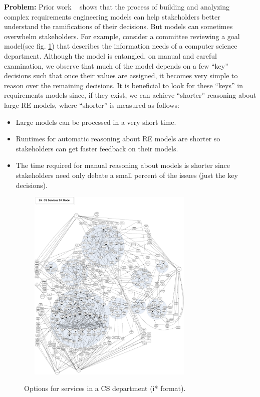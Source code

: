 \documentclass[table, xcdraw, sigconf,review, anonymous]{acmart}
\begin{document}
    \noindent\textbf{Problem:} Prior work ~\cite{Lamsweerde2001,amyot10} shows that the process of building and analyzing complex requirements engineering models can help stakeholders better understand the ramifications of their decisions. But models can sometimes overwhelm stakeholders. For example, consider a committee reviewing a goal model(see fig. \ref{fig:csServices}) that describes the information needs of a computer science department. Although the model is entangled, on manual and careful examination, we observe that much of the model depends on a few ``key'' decisions such that once their values are assigned, it becomes very simple to reason over the remaining decisions. It is beneficial to look for these ``keys'' in requirements models since, if they exist, we can achieve ``shorter'' reasoning about large RE models, where ``shorter'' is measured as follows:
    \begin{itemize}
     \item{Large models can be processed in a very short time.}
     \item{Runtimes for automatic reasoning about RE models are shorter so stakeholders can get faster feedback on their models.}
     \item{The time required for manual reasoning about models is shorter since stakeholders need only debate a small percent of the issues (just the key decisions).}
    \end{itemize}
   
    
    \begin{figure}[!t] 
  ~~~\includegraphics[width=3.1in]{img/CSServices.pdf} 
    \caption{Options for services in a CS department (i* format).}
    \label{fig:csServices}
\end{figure}
\end{document}
